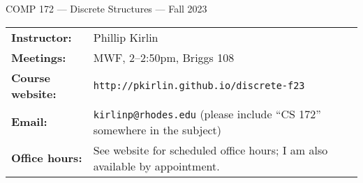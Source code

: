\documentclass [letterpaper,10pt]{article}
\begin{document}
\begin{center}
\Large COMP 172 --- Discrete Structures --- Fall 2023
\end{center}

\noindent\begin{tabular}{@{}ll}
\textbf{Instructor:} & Phillip Kirlin \\
\textbf{Meetings:} & MWF, 2--2:50pm, Briggs 108 \\
\textbf{Course website:} & \texttt{http://pkirlin.github.io/discrete-f23}\\
\textbf{Email:} &\texttt{kirlinp@rhodes.edu} (please include ``CS 172'' somewhere in the subject)\\
\textbf{Office hours:} & See website for scheduled office hours; I am also available by appointment.

\end{tabular}
\end{document}

